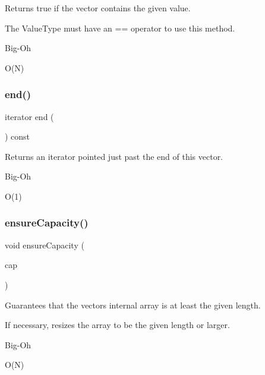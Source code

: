 Returns true if the vector contains the given value. 

The Value\+Type must have an == operator to use this method. \begin{DoxyRefDesc}{Big-\/\+Oh}
\item[\mbox{\hyperlink{BigOh__BigOh000110}{Big-\/\+Oh}}]O(\+N) \end{DoxyRefDesc}
\mbox{\label{classVector_a68b688a51bd0cf6fb5bc2cba292209a8}} 
\subsubsection{\texorpdfstring{end()}{end()}}
{\footnotesize\ttfamily iterator end (\begin{DoxyParamCaption}{ }\end{DoxyParamCaption}) const\hspace{0.3cm}{\ttfamily [inline]}}



Returns an iterator pointed just past the end of this vector. 

\begin{DoxyRefDesc}{Big-\/\+Oh}
\item[\mbox{\hyperlink{BigOh__BigOh000156}{Big-\/\+Oh}}]O(1) \end{DoxyRefDesc}
\mbox{\label{classVector_a9552fd9e921fc047fdd59e59d82e88ef}} 
\subsubsection{\texorpdfstring{ensure\+Capacity()}{ensureCapacity()}}
{\footnotesize\ttfamily void ensure\+Capacity (\begin{DoxyParamCaption}\item[{int}]{cap }\end{DoxyParamCaption})}



Guarantees that the vector\textquotesingle{}s internal array is at least the given length. 

If necessary, resizes the array to be the given length or larger. \begin{DoxyRefDesc}{Big-\/\+Oh}
\item[\mbox{\hyperlink{BigOh__BigOh000111}{Big-\/\+Oh}}]O(\+N) \end{DoxyRefDesc}
\mbox{\label{classVector_ad25fe1a007a2f00611d831198a1a86ea}} 
